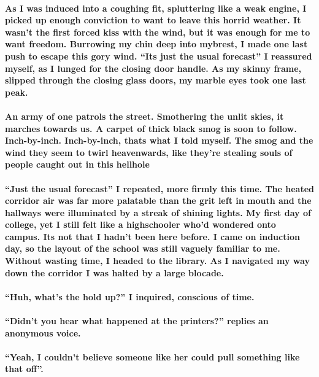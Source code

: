 \documentclass{book}
\begin{document}
\paragraph{As I was induced into a coughing fit, spluttering like a weak engine, I picked up enough conviction to want to leave this horrid weather. It wasn't the first forced kiss with the wind, but it was enough for me to want freedom. Burrowing my chin deep into mybrest, I made one last push to escape this gory wind. ``Its just the usual forecast'' I reassured myself, as I lunged for the closing door handle. As my skinny frame, slipped through the closing glass doors, my marble eyes took one last peak.}
\paragraph{An army of one patrols the street. Smothering the unlit skies, it marches towards us. A carpet of thick black smog is soon to follow. Inch-by-inch. Inch-by-inch, thats what I told myself. The smog and the wind they seem to twirl heavenwards, like they're stealing souls of people caught out in this hellhole}
\paragraph{``Just the usual forecast'' I repeated, more firmly this time. The heated corridor air was far more palatable than the grit left in mouth and the hallways were illuminated by a streak of shining lights. My first day of college, yet I still felt like a highschooler who'd wondered onto campus. Its not that I hadn't been here before. I came on induction day, so the layout of the school was still vaguely familiar to me. Without wasting time, I headed to the library. As I navigated my way down the corridor I was halted by a large blocade.}
\paragraph{``Huh, what's the hold up?'' I inquired, conscious of time.}
\paragraph{``Didn't you hear what happened at the printers?'' replies an anonymous voice.}
\paragraph{``Yeah, I couldn't believe someone like her could pull something like that off''.}
\end{document}
